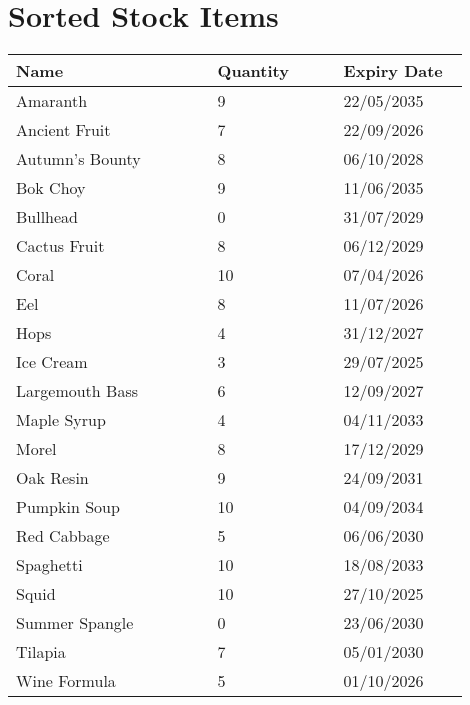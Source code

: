 \documentclass{article}
\begin{document}
\section*{Sorted Stock Items}
\begin{longtable}{|p{0.4\linewidth}|p{0.25\linewidth}|p{0.25\linewidth}|}\hline
\textbf{Name} & \textbf{Quantity} & \textbf{Expiry Date}\\
\hline
Amaranth & 9 & 22/05/2035 \\
\hline
Ancient Fruit & 7 & 22/09/2026 \\
\hline
Autumn's Bounty & 8 & 06/10/2028 \\
\hline
Bok Choy & 9 & 11/06/2035 \\
\hline
Bullhead & 0 & 31/07/2029 \\
\hline
Cactus Fruit & 8 & 06/12/2029 \\
\hline
Coral & 10 & 07/04/2026 \\
\hline
Eel & 8 & 11/07/2026 \\
\hline
Hops & 4 & 31/12/2027 \\
\hline
Ice Cream & 3 & 29/07/2025 \\
\hline
Largemouth Bass & 6 & 12/09/2027 \\
\hline
Maple Syrup & 4 & 04/11/2033 \\
\hline
Morel & 8 & 17/12/2029 \\
\hline
Oak Resin & 9 & 24/09/2031 \\
\hline
Pumpkin Soup & 10 & 04/09/2034 \\
\hline
Red Cabbage & 5 & 06/06/2030 \\
\hline
Spaghetti & 10 & 18/08/2033 \\
\hline
Squid & 10 & 27/10/2025 \\
\hline
Summer Spangle & 0 & 23/06/2030 \\
\hline
Tilapia & 7 & 05/01/2030 \\
\hline
Wine Formula & 5 & 01/10/2026 \\
\hline
\end{longtable}
\end{document}
